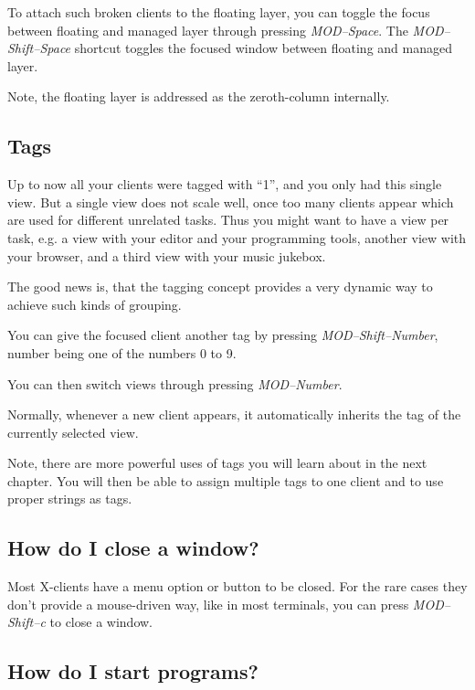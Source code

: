 \documentclass[12pt,a4paper]{article} %
\newcommand{\wmii}{\emph{wmii}}
\begin{document}
    To attach such broken clients to the floating layer, you can toggle the
    focus between floating and managed layer through pressing \emph{MOD--Space}.
    The \emph{MOD--Shift--Space} shortcut toggles the focused window between
    floating and managed layer.

    Note, the floating layer is addressed as the zeroth-column internally.

    \subsection{Tags}

    Up to now all your clients were tagged with ``1'', and you only had
    this single view. But a single view does not scale well, once
    too many clients appear which are used for different unrelated tasks.
    Thus you might want to have a view per task, e.g. a view
    with your editor and your programming tools, another view 
    with your browser, and a third view with your music jukebox.

    The good news is, that the tagging concept provides a very dynamic way to
    achieve such kinds of grouping.

    You can give the focused client another tag by pressing
    \emph{MOD--Shift--Number}, number being one of the numbers 0 to 9.

    You can then switch views through pressing \emph{MOD--Number}.

    Normally, whenever a new client appears, it automatically inherits the tag
    of the currently selected view.


    Note, there are more powerful uses of tags you will learn about in the next
    chapter. You will then be able to assign multiple tags to one client and to
    use proper strings as tags.

    \subsection{How do I close a window?}

    Most X-clients have a menu option or button to be closed. For the rare
    cases they don't provide a mouse-driven way, like in most terminals,
    you can press \emph{MOD--Shift--c} to close a window.

    \subsection{How do I start programs?}
\end{document}
